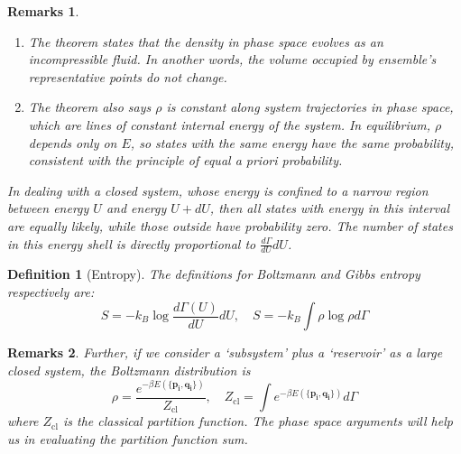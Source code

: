 \documentclass[a4paper]{article}
\newtheorem{remarks}{Remarks}[section]
\theoremstyle{new}
\newtheorem{defi}{Definition}[section]
\begin{document}
\begin{remarks}\leavevmode
\begin{enumerate}
    \item The theorem states that the density in phase space evolves as an incompressible fluid. In another words, the volume occupied by ensemble's representative points do not change. 
    \item The theorem also says $\rho$ is constant along system trajectories in phase space, which are lines of constant internal energy of the system. In equilibrium, $\rho$ depends only on $E$, so states with the same energy have the same probability, consistent with the principle of equal a priori probability.
\end{enumerate}
In dealing with a closed system, whose energy is confined to a narrow region between energy $U$ and energy $U+dU$, then all states with energy in this interval are equally likely, while those outside have probability zero. The number of states in this energy shell is directly proportional to $\frac{d\Gamma}{dU}dU$.
\end{remarks}
\begin{defi}[Entropy]
The definitions for Boltzmann and Gibbs entropy respectively are:
$$S=-k_B\log\frac{d\Gamma(U)}{dU}dU,\quad S=-k_B\int\rho\log\rho d\Gamma$$
\end{defi}
\begin{remarks}
Further, if we consider a `subsystem' plus a `reservoir' as a large closed system, the Boltzmann distribution is 
$$\rho=\frac{e^{-\beta E(\{\mathbf{p_i},\mathbf{q_i}\})}}{Z_{\text{cl}}},\quad Z_{\text{cl}}=\int e^{-\beta E(\{\mathbf{p_i},\mathbf{q_i}\})}d\Gamma$$
where $Z_{\text{cl}}$ is the classical partition function. The phase space arguments will help us in evaluating the partition function sum.
\end{remarks}
\newpage
\end{document}
